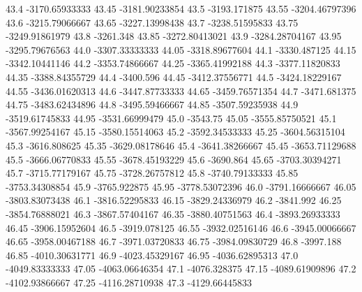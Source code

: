            43.4   -3170.65933333
          43.45   -3181.90233854
           43.5     -3193.171875
          43.55   -3204.46797396
           43.6   -3215.79066667
          43.65   -3227.13998438
           43.7   -3238.51595833
          43.75   -3249.91861979
           43.8        -3261.348
          43.85   -3272.80413021
           43.9   -3284.28704167
          43.95   -3295.79676563
           44.0   -3307.33333333
          44.05   -3318.89677604
           44.1     -3330.487125
          44.15   -3342.10441146
           44.2   -3353.74866667
          44.25   -3365.41992188
           44.3   -3377.11820833
          44.35   -3388.84355729
           44.4        -3400.596
          44.45   -3412.37556771
           44.5   -3424.18229167
          44.55   -3436.01620313
           44.6   -3447.87733333
          44.65   -3459.76571354
           44.7     -3471.681375
          44.75   -3483.62434896
           44.8   -3495.59466667
          44.85   -3507.59235938
           44.9   -3519.61745833
          44.95   -3531.66999479
           45.0         -3543.75
          45.05   -3555.85750521
           45.1   -3567.99254167
          45.15   -3580.15514063
           45.2   -3592.34533333
          45.25   -3604.56315104
           45.3     -3616.808625
          45.35   -3629.08178646
           45.4   -3641.38266667
          45.45   -3653.71129688
           45.5   -3666.06770833
          45.55   -3678.45193229
           45.6        -3690.864
          45.65   -3703.30394271
           45.7   -3715.77179167
          45.75   -3728.26757812
           45.8   -3740.79133333
          45.85   -3753.34308854
           45.9     -3765.922875
          45.95   -3778.53072396
           46.0   -3791.16666667
          46.05   -3803.83073438
           46.1   -3816.52295833
          46.15   -3829.24336979
           46.2        -3841.992
          46.25   -3854.76888021
           46.3   -3867.57404167
          46.35   -3880.40751563
           46.4   -3893.26933333
          46.45   -3906.15952604
           46.5     -3919.078125
          46.55   -3932.02516146
           46.6   -3945.00066667
          46.65   -3958.00467188
           46.7   -3971.03720833
          46.75   -3984.09830729
           46.8        -3997.188
          46.85   -4010.30631771
           46.9   -4023.45329167
          46.95   -4036.62895313
           47.0   -4049.83333333
          47.05   -4063.06646354
           47.1     -4076.328375
          47.15   -4089.61909896
           47.2   -4102.93866667
          47.25   -4116.28710938
           47.3   -4129.66445833
